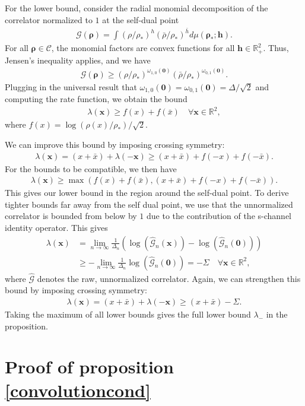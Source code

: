\documentclass[a4paper,11pt]{article}
\theoremstyle{plain}
\theoremstyle{definition}
\theoremstyle{remark}
\newcommand{\bs}[1]{\boldsymbol{#1}}
\newcommand{\bh}{{\bar{h}}}
\newcommand{\rhob}{{\bar{\rho}}}
\newcommand{\ba}{\begin{equation} \begin{aligned}}
\newcommand{\ea}{\end{aligned} \end{equation}}
\newcommand{\De}{\Delta}
\begin{document}
\begin{appendix}
For the lower bound, consider the radial monomial decomposition of the correlator normalized to $1$ at the self-dual point
\ba
\mathcal{G}(\bs{\rho}) = \int (\rho/\rho_*)^h (\rhob/\rho_*)^{\bh} d\mu(\bs{\rho}_*;\bs{h}).
\ea
For all $\bs{\rho} \in \mathscr{C}$, the monomial factors are convex functions for all $\bs{h} \in \mathbb{R}^2_+$. Thus, Jensen's inequality applies, and we have
\ba
\mathcal{G}(\bs{\rho}) \geq (\rho/\rho_*)^{\omega_{1,0}(\bs{0})} (\rhob/\rho_*)^{\omega_{0,1}(\bs{0})}.
\ea
Plugging in the universal result that $\omega_{1,0}(\bs0)= \omega_{0,1}(\bs0) = \De/\sqrt{2}$ and computing the rate function, we obtain the bound
\ba
\lambda(\bs{x}) \geq f(x) + f(\bar{x}) \quad \forall \bs{x} \in \mathbb{R}^2,
\ea
where $f(x) = \log(\rho(x) /\rho_*)/\sqrt{2}$. 

We can improve this bound by imposing crossing symmetry:
\ba
\lambda(\bs{x}) = (x+\bar{x}) + \lambda(-\bs{x}) \geq (x+\bar{x}) + f(-x) + f(-\bar{x}).
\ea
For the bounds to be compatible, we then have
\ba
\lambda(\bs{x}) \geq \max(f(x) + f(\bar{x}) , (x+\bar{x}) + f(-x) + f(-\bar{x}) ).
\ea
This gives our lower bound in the region around the self-dual point. To derive tighter bounds far away from the self dual point, we use that the unnormalized correlator is bounded from below by $1$ due to the contribution of the s-channel identity operator. This gives
\ba
\lambda(\bs{x}) &= \lim_{n \to \infty} \frac{1}{\De_n} \left( \log\left( \widehat{\mathcal{G}}_n(\bs{x} ) \right) - \log\left(\widehat{\mathcal{G}}_n(\bs{0}) \right)\right)\\
&\geq  - \lim_{n\to\infty} \frac{1}{\De_n}\log\left( \widehat{\mathcal{G}}_n(\bs{0})\right)  = - \Sigma \quad \forall \bs{x} \in \mathbb{R}^2 ,
\ea
where $\widehat{\mathcal{G}}$ denotes the raw, unnormalized correlator. Again, we can strengthen this bound by imposing crossing symmetry:
\ba
\lambda(\bs{x}) = (x+\bar{x}) + \lambda(-\bs{x}) \geq (x+\bar{x}) - \Sigma.
\ea
Taking the maximum of all lower bounds gives the full lower bound $\lambda_-$ in the proposition.


\section{Proof of proposition \ref{convolutioncond}}
\label{convolutioncondproof}


\end{appendix}
\end{document}
